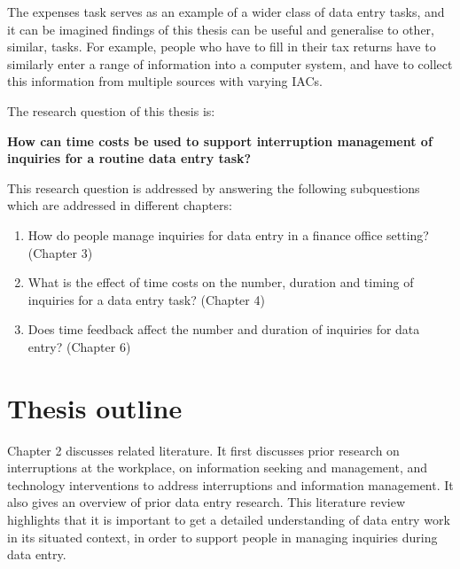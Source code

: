 The expenses task serves as an example of a wider class of data entry tasks, and it can be imagined findings of this thesis can be useful and generalise to other, similar, tasks. For example, people who have to fill in their tax returns have to similarly enter a range of information into a computer system, and have to collect this information from multiple sources with varying IACs.

The research question of this thesis is:

\textbf{How can time costs be used to support interruption management of inquiries for a routine data entry task?}

This research question is addressed by answering the following subquestions which are addressed in different chapters:

\begin{enumerate}
\item How do people manage inquiries for data entry in a finance office setting? (Chapter 3)
\item What is the effect of time costs on the number, duration and timing of inquiries for a data entry task?  (Chapter 4)
\item  Does time feedback affect the number and duration of inquiries for data entry? (Chapter 6)
\end{enumerate}


\section{Thesis outline}
Chapter 2 discusses related literature. It first discusses prior research on interruptions at the workplace, on information seeking and management, and technology interventions to address interruptions and information management. It also gives an overview of prior data entry research. This literature review highlights that it is important to get a detailed understanding of data entry work in its situated context, in order to support people in managing inquiries during data entry. 

